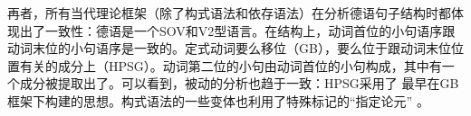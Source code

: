 再者，所有当代理论框架（除了构式语法和依存语法）在分析德语句子结构时都体现出了一致性：德语是一个SOV和V2型语言。在结构上，动词首位的小句语序跟动词末位的小句语序是一致的。定式动词要么移位（GB），要么位于跟动词末位位置有关的成分上（HPSG）。动词第二位的小句由动词首位的小句构成，其中有一个成分被提取出了。可以看到，被动的分析也趋于一致：HPSG采用了 \citet{Haider84b,Haider85b,Haider86}最早在GB框架下构建的思想。构式语法的一些变体也利用了特殊标记的“指定论元” \citep[--57]{MR2001a}。

